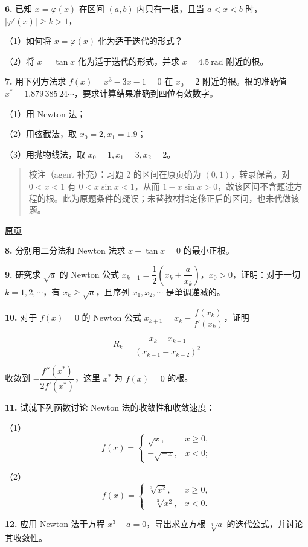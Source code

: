 \documentclass[
  10pt,
  fontset=fandol]{ctexart}
\begin{document}
\textbf{6.} 已知 \(x=\varphi(x)\) 在区间 \((a,b)\) 内只有一根，且当 \(a<x<b\) 时，\(|\varphi'(x)|\geqslant k>1\)，

（1）如何将 \(x=\varphi(x)\) 化为适于迭代的形式？

（2）将 \(x=\tan x\) 化为适于迭代的形式，并求 \(x=4.5\ \mathrm{rad}\) 附近的根。

\textbf{7.} 用下列方法求 \(f(x)=x^3-3x-1=0\) 在 \(x_0=2\) 附近的根。根的准确值 \(x^*=1.879\,385\,24\cdots\)，要求计算结果准确到四位有效数字。

（1）用 Newton 法；

（2）用弦截法，取 \(x_0=2,x_1=1.9\)；

（3）用抛物线法，取 \(x_0=1,x_1=3,x_2=2\)。

\begin{quote}
校注（agent 补充）：习题 2 的区间在原页确为 \((0,1)\)，转录保留。对 \(0<x<1\) 有 \(0<x\sin x<1\)，从而 \(1-x\sin x>0\)，故该区间不含题述方程的根。此为原题条件的疑误；未替教材指定修正后的区间，也未代做该题。
\end{quote}

\href{../../source-images/pdf-176.jpeg}{原页}

\textbf{8.} 分别用二分法和 Newton 法求 \(x-\tan x=0\) 的最小正根。

\textbf{9.} 研究求 \(\sqrt{a}\) 的 Newton 公式 \(x_{k+1}=\dfrac{1}{2}\left(x_k+\dfrac{a}{x_k}\right)\)，\(x_0>0\)，证明：对于一切 \(k=1,2,\cdots\)，有 \(x_k\geqslant\sqrt{a}\)，且序列 \(x_1,x_2,\cdots\) 是单调递减的。

\textbf{10.} 对于 \(f(x)=0\) 的 Newton 公式 \(x_{k+1}=x_k-\dfrac{f(x_k)}{f'(x_k)}\)，证明

\[
R_k=\frac{x_k-x_{k-1}}{(x_{k-1}-x_{k-2})^2}
\]

收敛到 \(-\dfrac{f''(x^*)}{2f'(x^*)}\)，这里 \(x^*\) 为 \(f(x)=0\) 的根。

\textbf{11.} 试就下列函数讨论 Newton 法的收敛性和收敛速度：

（1） \[
f(x)=\begin{cases}
\sqrt{x},&x\geqslant0,\\
-\sqrt{-x},&x<0;
\end{cases}
\]

（2） \[
f(x)=\begin{cases}
\sqrt[3]{x^2},&x\geqslant0,\\
-\sqrt[3]{x^2},&x<0.
\end{cases}
\]

\textbf{12.} 应用 Newton 法于方程 \(x^3-a=0\)，导出求立方根 \(\sqrt[3]{a}\) 的迭代公式，并讨论其收敛性。
\end{document}

